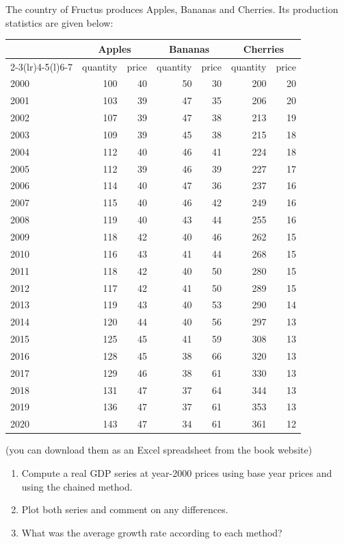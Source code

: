 \noindent The country of Fructus produces Apples, Bananas and Cherries. Its production statistics are given below:
\begin{center}\small
\begin{tabular}{@{}l*{6}{r}@{}}
\toprule
 & \multicolumn{2}{c}{\textbf{Apples}} & \multicolumn{2}{c}{\textbf{Bananas}} & \multicolumn{2}{c}{\textbf{Cherries}} \\
\cmidrule(lr){2-3}\cmidrule(lr){4-5}\cmidrule(l){6-7}
 & quantity & price & quantity & price & quantity & price \\
\midrule
2000 & 100 & 40 & 50 & 30 & 200 & 20 \\
2001 & 103 & 39 & 47 & 35 & 206 & 20 \\
2002 & 107 & 39 & 47 & 38 & 213 & 19 \\
2003 & 109 & 39 & 45 & 38 & 215 & 18 \\
2004 & 112 & 40 & 46 & 41 & 224 & 18 \\
2005 & 112 & 39 & 46 & 39 & 227 & 17 \\
2006 & 114 & 40 & 47 & 36 & 237 & 16 \\
2007 & 115 & 40 & 46 & 42 & 249 & 16 \\
2008 & 119 & 40 & 43 & 44 & 255 & 16 \\
2009 & 118 & 42 & 40 & 46 & 262 & 15 \\
2010 & 116 & 43 & 41 & 44 & 268 & 15 \\
2011 & 118 & 42 & 40 & 50 & 280 & 15 \\
2012 & 117 & 42 & 41 & 50 & 289 & 15 \\
2013 & 119 & 43 & 40 & 53 & 290 & 14 \\
2014 & 120 & 44 & 40 & 56 & 297 & 13 \\
2015 & 125 & 45 & 41 & 59 & 308 & 13 \\
2016 & 128 & 45 & 38 & 66 & 320 & 13 \\
2017 & 129 & 46 & 38 & 61 & 330 & 13 \\
2018 & 131 & 47 & 37 & 64 & 344 & 13 \\
2019 & 136 & 47 & 37 & 61 & 353 & 13 \\
2020 & 143 & 47 & 34 & 61 & 361 & 12 \\
\bottomrule
\end{tabular}
\end{center}
\noindent(you can download them as an Excel spreadsheet from the book website)
\begin{enumerate}[label=(\alph*),leftmargin=2.2em,topsep=2pt,itemsep=1pt]
\item Compute a real GDP series at year-2000 prices using base year prices and using the chained method.
\item Plot both series and comment on any differences.
\item What was the average growth rate according to each method?
\end{enumerate}
